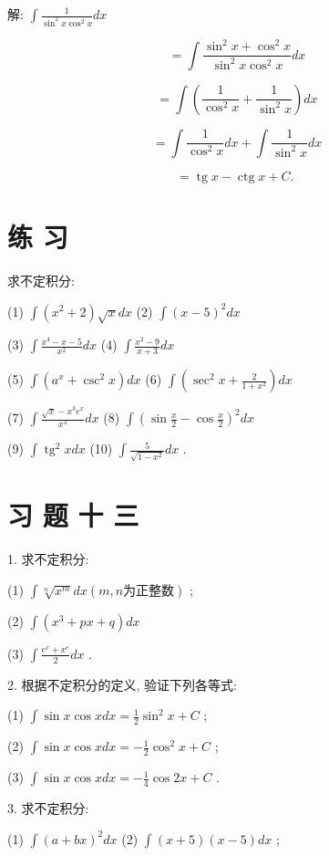 \documentclass[10pt]{article}
\begin{document}
解: \(\int \frac{1}{{\sin }^{2}x{\cos }^{2}x}{dx}\)

\[
= \int \frac{{\sin }^{2}x + {\cos }^{2}x}{{\sin }^{2}x{\cos }^{2}x}{dx}
\]

\[
= \int \left( {\frac{1}{{\cos }^{2}x} + \frac{1}{{\sin }^{2}x}}\right) {dx}
\]

\[
= \int \frac{1}{{\cos }^{2}x}{dx} + \int \frac{1}{{\sin }^{2}x}{dx}
\]

\[
= \operatorname{tg}x - \operatorname{ctg}x + C\text{. }
\]

\section*{练 习}

求不定积分:

(1) \(\int \left( {{x}^{2} + 2}\right) \sqrt{x}{dx}\) (2) \(\int {\left( x - 5\right) }^{2}{dx}\)

(3) \(\int \frac{{x}^{4} - x - 5}{{x}^{2}}{dx}\) (4) \(\int \frac{{x}^{2} - 9}{x + 3}{dx}\)

(5) \(\int \left( {{a}^{x} + {\csc }^{2}x}\right) {dx}\) (6) \(\int \left( {{\sec }^{2}x + \frac{2}{1 + {x}^{2}}}\right) {dx}\)

(7) \(\int \frac{\sqrt{x} - {x}^{3}{e}^{x}}{{x}^{3}}{dx}\) (8) \(\int {\left( \sin \frac{x}{2} - \cos \frac{x}{2}\right) }^{2}{dx}\)

(9) \(\int {\operatorname{tg}}^{2}{xdx}\) (10) \(\int \frac{5}{\sqrt{1 - {x}^{2}}}{dx}\) .

\section*{习 题 十 三}

1. 求不定积分:

(1) \(\int \sqrt[n]{{x}^{m}}{dx}\left( {m,n\text{为正整数}}\right)\) ;

(2) \(\int \left( {{x}^{3} + {px} + q}\right) {dx}\)

(3) \(\int \frac{{e}^{x} + {x}^{e}}{2}{dx}\) .

2. 根据不定积分的定义, 验证下列各等式:

(1) \(\int \sin x\cos {xdx} = \frac{1}{2}{\sin }^{2}x + C\) ;

(2) \(\int \sin x\cos {xdx} = - \frac{1}{2}{\cos }^{2}x + C\) ;

(3) \(\int \sin x\cos {xdx} = - \frac{1}{4}\cos {2x} + C\) .

3. 求不定积分:

(1) \(\int {\left( a + bx\right) }^{2}{dx}\) (2) \(\int \left( {x + 5}\right) \left( {x - 5}\right) {dx}\) ;
\end{document}
